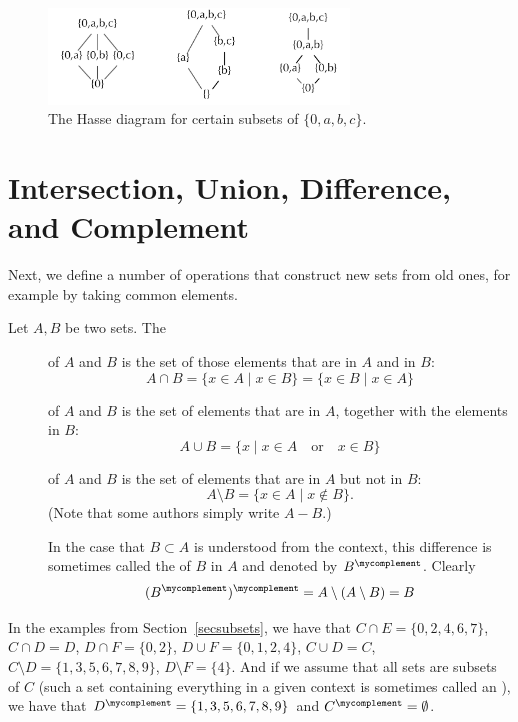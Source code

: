 \begin{figure}[t]
\begin{center}
\includegraphics[width=8cm]{pic/HasseV4.pdf}
\end{center}
\caption{The Hasse diagram for certain subsets of $\{0,a,b,c\}$.}
\label{fighasseV4}
\end{figure}



\section{Intersection, Union, Difference, and Complement}

Next, we define a number of operations that construct new sets from old
ones, for example by taking common elements.
\begin{defn}
Let $A,B$ be two sets. The
\begin{description}
\item[] of $A$ and $B$ is the set of those elements
that are in $A$ and in $B$:
\[
A\cap B=\{x\in A\mid x\in B\}=\{x\in B\mid x\in A\}
\]
\item[] of $A$ and $B$ is the set of elements
that are in $A$, together with the elements in $B$:
\[
A\cup B=\{x\mid x\in A\quad\mbox{or}\quad x\in B\}
\]
\item[] of $A$ and $B$ is the set of elements that are in
$A$ but not in $B$:
\[
A\setminus B=\{x\in A\mid x\not\in B\}.
\]
(Note that some authors simply write $A-B$.)

In the case that $B\subset A$ is understood from the context, this difference is sometimes called
the  of $B$ in $A$ and denoted by $B^\mycomplement$.
Clearly 
\[
(B^\mycomplement)^\mycomplement=A\setminus(A\setminus B)=B
\]
\end{description}
\end{defn}
In the examples from Section~\ref{secsubsets}, we have that
$C\cap E=\{0,2,4,6,7\}$, $C\cap D=D$, $D\cap
F=\{0,2\}$, $D\cup F=\{0,1,2,4\}$, $C\cup D=C$, $C\setminus
D=\{1,3,5,6,7,8,9\}$, $D\setminus F=\{4\}$.
And if we assume that all sets are subsets of $C$ (such a set containing
everything in a given context is sometimes called an ), we
have that $D^\mycomplement=\{1,3,5,6,7,8,9\}$ and $C^\mycomplement=\emptyset$.

